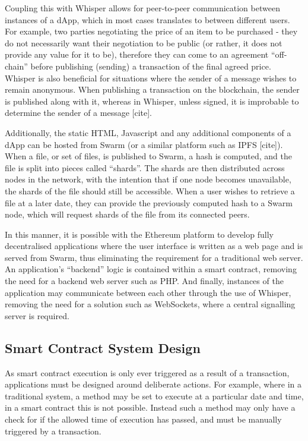 Coupling this with Whisper allows for peer-to-peer communication between instances of a dApp, which in most cases translates to between different users. For example, two parties negotiating the price of an item to be purchased - they do not necessarily want their negotiation to be public (or rather, it does not provide any value for it to be), therefore they can come to an agreement “off-chain” before publishing (sending) a transaction of the final agreed price. Whisper is also beneficial for situations where the sender of a message wishes to remain anonymous. When publishing a transaction on the blockchain, the sender is published along with it, whereas in Whisper, unless signed, it is improbable to determine the sender of a message [cite].

Additionally, the static HTML, Javascript and any additional components of a dApp can be hosted from Swarm (or a similar platform such as IPFS [cite]). When a file, or set of files, is published to Swarm, a hash is computed, and the file is split into pieces called “shards”. The shards are then distributed across nodes in the network, with the intention that if one node becomes unavailable, the shards of the file should still be accessible. When a user wishes to retrieve a file at a later date, they can provide the previously computed hash to a Swarm node, which will request shards of the file from its connected peers.

In this manner, it is possible with the Ethereum platform to develop fully decentralised applications where the user interface is written as a web page and is served from Swarm, thus eliminating the requirement for a traditional web server. An application’s “backend” logic is contained within a smart contract, removing the need for a backend web server such as PHP. And finally, instances of the application may communicate between each other through the use of Whisper, removing the need for a solution such as WebSockets, where a central signalling server is required.

\subsection{Smart Contract System Design}

As smart contract execution is only ever triggered as a result of a transaction, applications must be designed around deliberate actions. For example, where in a traditional system, a method may be set to execute at a particular date and time, in a smart contract this is not possible. Instead such a method may only have a check for if the allowed time of execution has passed, and must be manually triggered by a transaction.

